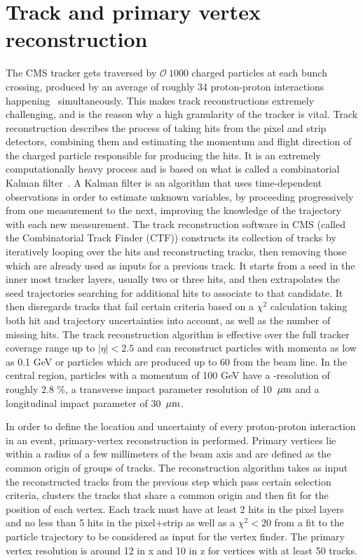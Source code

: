 \section{Track and primary vertex reconstruction}
The CMS tracker gets traversed by $\mathcal{O}~1000$ charged particles at each bunch crossing, produced by an average of roughly 34 proton-proton interactions happening ~simultaneously. This makes track reconstructions extremely challenging, and is the reason why a high granularity of the tracker is vital.
Track reconstruction describes the process of taking hits from the pixel and strip detectors, combining them and estimating the momentum and flight direction of the charged particle responsible for producing the hits. It is an extremely computationally heavy process and is based on what is called a combinatorial Kalman filter~\cite{BILLOIR1989390}. A Kalman filter is an algorithm that uses time-dependent observations in order to estimate unknown variables, by proceeding progressively from one measurement to the next, improving the knowledge of the
trajectory with each new measurement. The track reconstruction software in CMS (called the Combinatorial Track Finder (CTF)) constructs its collection of tracks by iteratively looping over the hits and reconstructing tracks, then removing those which are already used as inputs for a previous track. It starts from a seed in the inner most tracker layers, usually two or three hits, and then extrapolates the seed trajectories searching for additional hits to associate to that candidate. It then disregards tracks that fail certain criteria  based on a $\chi^2$ calculation taking both hit and trajectory uncertainties into account, as well as the number of missing hits.
The track reconstruction algorithm is effective over the full tracker coverage range up to $|\eta|<2.5$ and can reconstruct particles with momenta as low as 0.1 GeV or particles which are produced up to 60 \cm from the beam line. In the central region, particles with a momentum of 100 GeV have a \PT-resolution of roughly 2.8 \%, a transverse impact parameter resolution of 10 $\,\mu\text{m}$ and a longitudinal impact parameter of 30 $\,\mu\text{m}$. 


In order to define the location and uncertainty of every proton-proton interaction in an event, primary-vertex reconstruction in performed. Primary vertices lie within a radius of a few millimeters of the beam axis and are defined as the common origin of groups of tracks.
The reconstruction algorithm takes as input the reconstructed tracks from the previous step which pass certain selection criteria, clusters the tracks that share a common origin and then fit for the position of each vertex. Each track must have at least 2 hits in the pixel layers and no less than 5 hits in the pixel+strip as well as a $\chi^2<20$ from a fit to the particle trajectory to be considered as input for the vertex finder. The primary vertex resolution is around 12 \micron in x and 10 \micron in z for vertices with at least 50 tracks.


